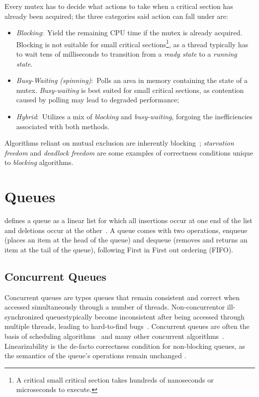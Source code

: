 Every mutex has to decide what actions to take when a critical section has
already been acquired; the three categories said action can fall under are: 
\begin{itemize}
\item \emph{Blocking}:~Yield the remaining CPU time if the mutex is already acquired.
Blocking is not suitable for small critical sections\footnote{A critical
small critical section takes hundreds of nanoseconds or microseconds to
execute.}, as a thread typically has to wait tens of milliseconds to transition
from a \emph{ready state} to a \emph{running state}.
\item \emph{Busy-Waiting (spinning)}:~Polls an area in memory containing the
state of a mutex. \emph{Busy-waiting} is best suited for small critical sections, as
contention caused by polling may lead to degraded performance;
\item \emph{Hybrid}:~Utilizes a mix of \emph{blocking} and \emph{busy-waiting},
forgoing the inefficiencies associated with both methods.
\end{itemize}

Algorithms reliant on mutual exclusion are inherently
blocking~\citep[Section~3.8]{herlihy2020art}; \emph{starvation freedom} and
\emph{deadlock freedom} are some examples of correctness conditions unique to
\emph{blocking} algorithms.


\section{Queues}
\citeauthor{knuth1968art} defines a queue as a linear list for which all
insertions occur at one end of the list and deletions occur at the
other~\citep{knuth1968art}. A queue comes with two operations, enqueue (places
an item at the head of the queue) and dequeue (removes and returns an item at
the tail of the queue), following First in First out ordering (FIFO).

\subsection{Concurrent Queues}
Concurrent queues are types queues that remain consistent and correct when
accessed simultaneously through a number of threads. Non-concurrent\textemdash or
ill-synchronized queues\textemdash typically become inconsistent after being
accessed through multiple threads, leading
to hard-to-find bugs~\citep{yahav2003automatically}. Concurrent queues are often the basis of scheduling
algorithms~\citep{debattista2002high} and many other concurrent
algorithms~\citep{yahav2003automatically}. Linearizability is the de-facto correctness condition
for non-blocking queues, as the semantics of the queue's
operations remain unchanged \citep{mellor1987concurrent, valois1995datastructures}.

